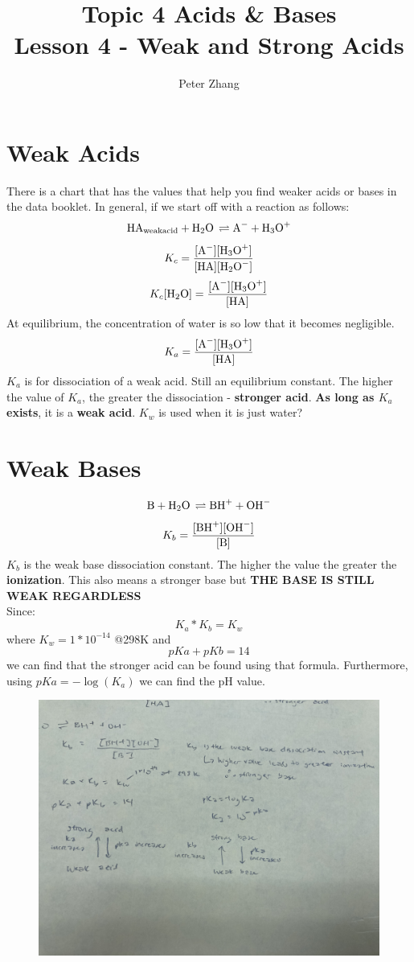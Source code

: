 \documentclass{article}
\title{Topic 4 Acids \& Bases\\Lesson 4 - Weak and Strong Acids}
\author{Peter Zhang}
\begin{document}
\maketitle
\tableofcontents
\newpage

\section{Weak Acids}
There is a chart that has the values that help you find weaker acids or bases in the data booklet. In general, if we start off with a reaction as follows:
$$\ce{HA_{weak acid} + H2O \rightleftharpoons A- + H3O+}$$
$$K_{c} = \frac{[\ce{A-}][\ce{H3O+}]}{[\ce{HA}][\ce{H2O-}]}$$
$$K_{c}[\ce{H2O}] = \frac{[\ce{A-}][\ce{H3O+}]}{[\ce{HA}]}$$
At equilibrium, the concentration of water is so low that it becomes negligible.
$$K_{a} = \frac{[\ce{A-}][\ce{H3O+}]}{[\ce{HA}]}$$
$K_{a}$ is for dissociation of a weak acid. Still an equilibrium constant. The higher the value of $K_{a}$, the greater the dissociation - \textbf{stronger acid}. \textbf{As long as $K_{a}$ exists}, it is a \textbf{weak acid}. $K_{w}$ is used when it is just water?


\section{Weak Bases}
$$\ce{B + H2O \rightleftharpoons BH+ + OH-}$$
$$K_{b} = \frac{[\ce{BH+}][\ce{OH-}]}{[\ce{B}]}$$
$K_{b}$ is the weak base dissociation constant. The higher the value the greater the \textbf{ionization}. This also means a stronger base but \textbf{THE BASE IS STILL WEAK REGARDLESS}\\
Since: $$K_{a} * K_{b} = K_{w}$$ where $K_{w} = 1*10^{-14}$ @298K and $$pKa + pKb = 14$$ we can find that the stronger acid can be found using that formula. Furthermore, using $pKa = -\log{(K_{a})}$ we can find the pH value.

\begin{figure}[H]
\includegraphics[width=\textwidth]{4.4fig1.jpg}
\end{figure}
\end{document}
